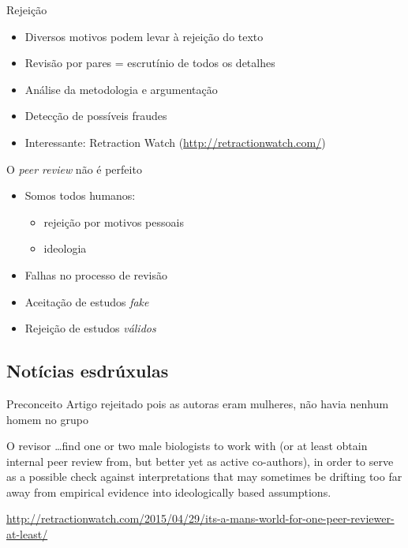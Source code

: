 \documentclass{beamer}
\begin{document}
\begin{frame}{Rejeição}
  \begin{itemize}
    \footnotesize
  \item Diversos motivos podem levar à rejeição do texto
    \medskip
  \item Revisão por pares = escrutínio de todos os detalhes
    \medskip
  \item Análise da metodologia e argumentação
    \medskip
  \item Detecção de possíveis fraudes
    \medskip
  \item Interessante: Retraction Watch (\url{http://retractionwatch.com/})
  \end{itemize}
\end{frame}

\begin{frame}{O {\em peer review} não é perfeito}
  \begin{itemize}
    \footnotesize
  \item Somos todos humanos:
    \begin{itemize}
      \scriptsize
    \item rejeição por motivos pessoais
    \item ideologia
    \end{itemize}
    \medskip
  \item Falhas no processo de revisão
    \medskip
  \item Aceitação de estudos {\em fake}
    \medskip
  \item Rejeição de estudos {\em válidos}
  \end{itemize}
\end{frame}

\subsection{Notícias esdrúxulas}

\begin{frame}{Preconceito}
  Artigo rejeitado pois as autoras eram mulheres, não havia nenhum
  homem no grupo
    \begin{block}{O revisor}
      \scriptsize
      \ldots find one or two male biologists to work with (or at least
      obtain internal peer review from, but better yet as active
      co-authors), in order to serve as a possible check against
      interpretations that may sometimes be drifting too far away from
      empirical evidence into ideologically based assumptions.
    \end{block}

    \vfill
    \tiny
\url{http://retractionwatch.com/2015/04/29/its-a-mans-world-for-one-peer-reviewer-at-least/}
\end{frame}
\end{document}
